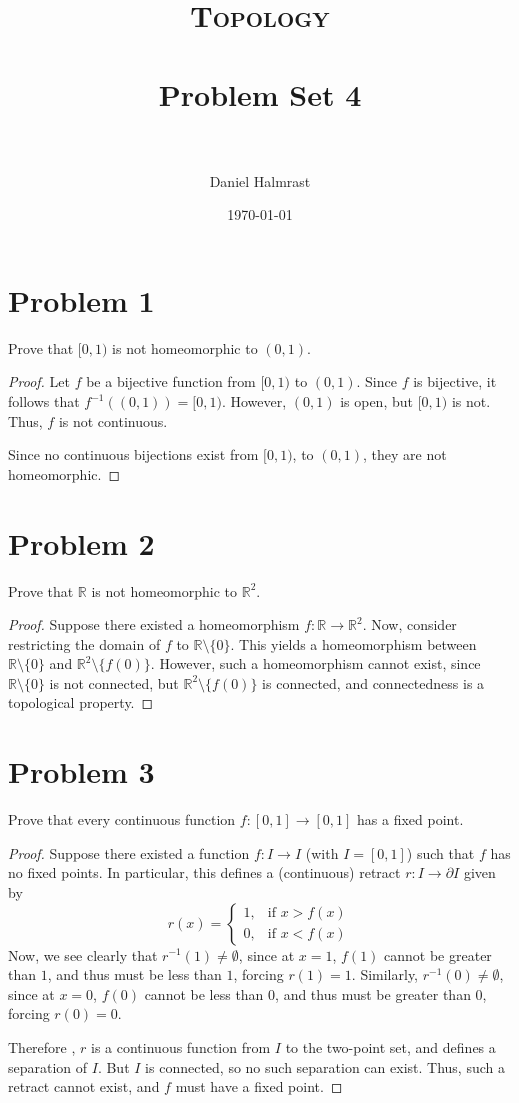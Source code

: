 \documentclass[fontsize=11pt]{scrartcl} %
\title{	
\normalfont \normalsize 
\textsc{Topology} \\ [25pt] %
\horrule{0.5pt} \\[0.4cm] %
\huge Problem Set 4 \\ %
\horrule{2pt} \\[0.5cm] %
}
\author{Daniel Halmrast} %
\date{\normalsize\today} %
\numberwithin{equation}{section} %
\numberwithin{figure}{section} %
\numberwithin{table}{section} %
\newcommand{\R}{\mathbb{R}}
\begin{document}
\maketitle %

\section*{Problem 1}
Prove that $[0,1)$ is not homeomorphic to $(0,1)$.
\\
\begin{proof}
    Let $f$ be a bijective function from $[0,1)$ to $(0,1)$. Since $f$ is
    bijective, it follows that $f^{-1}((0,1))=[0,1)$. However, $(0,1)$ is open,
    but $[0,1)$ is not. Thus, $f$ is not continuous.

    Since no continuous bijections exist from $[0,1)$, to $(0,1)$, they are not
    homeomorphic.
\end{proof}

\section*{Problem 2}
Prove that $\R$ is not homeomorphic to $\R^2$.
\\
\begin{proof}
    Suppose there existed a homeomorphism $f:\R\to\R^2$. Now, consider
    restricting the domain of $f$ to $\R\setminus\{0\}$. This yields a
    homeomorphism between $\R\setminus\{0\}$ and $\R^2\setminus\{f(0)\}$.
    However, such a homeomorphism cannot exist, since $\R\setminus\{0\}$ is not
    connected, but $\R^2\setminus\{f(0)\}$ is connected, and connectedness is a
    topological property.
\end{proof}

\newpage

\section*{Problem 3}
Prove that every continuous function $f:[0,1]\to [0,1]$ has a fixed point.
\\
\begin{proof}
    Suppose there existed a function $f:I\to I$ (with $I=[0,1]$) such that $f$
    has no fixed points. In particular, this defines a (continuous) retract
    $r:I\to \partial I$ given by
    \[
        r(x) =
        \begin{cases}
            1, &\textrm{if } x > f(x)\\
            0, &\textrm{if } x < f(x)
        \end{cases}
    \]
    Now, we see clearly that $r^{-1}(1)\neq \emptyset$, since at $x=1$, $f(1)$
    cannot be greater than $1$, and thus must be less than $1$, forcing
    $r(1)=1$. Similarly, $r^{-1}(0)\neq \emptyset$, since at $x=0$, $f(0)$
    cannot be less than $0$, and thus must be greater than $0$, forcing
    $r(0)=0$.

    Therefore , $r$ is a continuous function from $I$ to the two-point set, and
    defines a separation of $I$. But $I$ is connected, so no such separation can
    exist. Thus, such a retract cannot exist, and $f$ must have a fixed point.
\end{proof}
\end{document}
